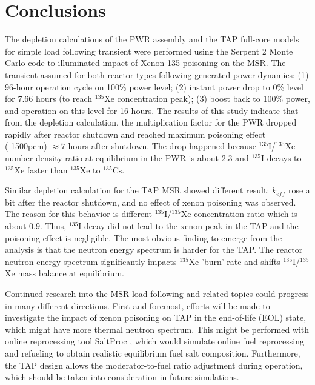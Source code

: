 \documentclass{anstrans}
\begin{document}
\section{Conclusions}
The depletion calculations of the \gls{PWR} assembly and the \gls{TAP} full-core  
models for simple load following transient were performed using the Serpent 2 
Monte Carlo code to illuminated impact of Xenon-135 poisoning on the \gls{MSR}.
The transient assumed for both reactor types following generated power dynamics: 
(1) 96-hour operation cycle on 100\% power level; (2) instant power drop to 0\% 
level for 7.66 hours (to reach $^{135}$Xe concentration peak); (3) boost back to 
100\% power, and operation on this level for 16 hours. The results of this 
study indicate that from the depletion calculation, the multiplication factor 
for the \gls{PWR} dropped rapidly after reactor shutdown and reached maximum 
poisoning effect (-1500pcm) $\approx7$ hours after shutdown. The drop  
happened because $^{135}$I/$^{135}$Xe number density ratio at equilibrium in 
the \gls{PWR} is about 2.3 and $^{135}$I decays to $^{135}$Xe faster than 
$^{135}$Xe to $^{135}$Cs.

Similar depletion calculation for the \gls{TAP} \gls{MSR} showed different 
result: $k_{eff}$ rose a bit after the reactor shutdown, and no effect of xenon 
poisoning was observed. The reason for this behavior is different 
$^{135}$I/$^{135}$Xe concentration ratio which is about 0.9. Thus, $^{135}$I 
decay did not lead to the xenon peak in the \gls{TAP} and the poisoning effect 
is negligible. The most obvious finding to emerge from the analysis is that the 
neutron energy spectrum is harder for the \gls{TAP}. The reactor neutron energy
spectrum significantly impacts $^{135}$Xe 'burn' rate and shifts  
$^{135}$I/$^{135}$Xe mass balance at equilibrium.

Continued research into the \gls{MSR} load following and related topics 
could progress in many different directions. First and foremost, efforts will 
be made to investigate the impact of xenon poisoning on \gls{TAP} in the 
end-of-life (EOL) state, which might have more thermal neutron spectrum. This 
might be performed with online reprocessing tool SaltProc 
\cite{rykhlevskii_modeling_2019,rykhlevskii_arfc/saltproc:_2018}, which would  
simulate online fuel reprocessing and refueling to obtain realistic 
equilibrium fuel salt composition. Furthermore, the \gls{TAP} design allows 
the moderator-to-fuel ratio adjustment during operation, which should be taken 
into consideration in future simulations.
\end{document}
